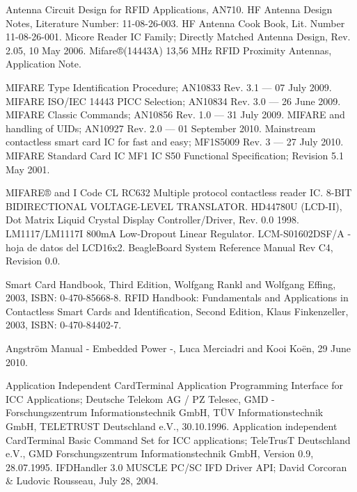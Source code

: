 \begin{thebibliography}{200}

 Antenna Circuit Design for RFID Applications, AN710.
 HF Antenna Design Notes, Literature Number: 11-08-26-003.
 HF Antenna Cook Book, Lit. Number 11-08-26-001.
 Micore Reader IC Family; Directly Matched Antenna Design, Rev. 2.05, 10 May 2006.
 Mifare®(14443A) 13,56 MHz RFID Proximity Antennas, Application Note.

\bibitem{} MIFARE Type Identification Procedure; AN10833 Rev. 3.1 — 07 July 2009.
\bibitem{} MIFARE ISO/IEC 14443 PICC Selection; AN10834 Rev. 3.0 — 26 June 2009.
\bibitem{} MIFARE Classic Commands; AN10856 Rev. 1.0 — 31 July 2009.
\bibitem{} MIFARE and handling of UIDs; AN10927 Rev. 2.0 — 01 September 2010.
\bibitem{} Mainstream contactless smart card IC for fast and easy; MF1S5009 Rev. 3 — 27 July 2010.
\bibitem{} MIFARE Standard Card IC MF1 IC S50 Functional Specification; Revision 5.1 May 2001.

 MIFARE® and I Code CL RC632 Multiple protocol contactless reader IC.
 8-BIT BIDIRECTIONAL VOLTAGE-LEVEL TRANSLATOR.
 HD44780U (LCD-II), Dot Matrix Liquid Crystal Display Controller/Driver, Rev. 0.0 1998. 
 LM1117/LM1117I 800mA Low-Dropout Linear Regulator.
 LCM-S01602DSF/A - hoja de datos del LCD16x2.
 BeagleBoard System Reference Manual Rev C4, Revision 0.0.

 Smart Card Handbook, Third Edition, Wolfgang Rankl and Wolfgang Effing, 2003, ISBN: 0-470-85668-8. 
 RFID Handbook: Fundamentals and Applications in Contactless Smart Cards and Identification,
Second Edition, Klaus Finkenzeller, 2003, ISBN: 0-470-84402-7. 

 Angström Manual - Embedded Power -, Luca Merciadri and Kooi Koën, 29 June 2010.

 Application Independent CardTerminal Application Programming Interface for ICC Applications; 
Deutsche Telekom AG / PZ Telesec, GMD - Forschungszentrum Informationstechnik GmbH, TÜV Informationstechnik GmbH, TELETRUST Deutschland e.V., 30.10.1996.
 Application independent CardTerminal Basic Command Set for ICC applications; 
TeleTrusT Deutschland e.V., GMD Forschungszentrum Informationstechnik GmbH, Version 0.9, 28.07.1995.
 IFDHandler 3.0 MUSCLE PC/SC IFD Driver API; David Corcoran \& Ludovic Rousseau, July 28, 2004.



\end{thebibliography}
